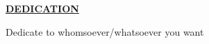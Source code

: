 {\centering \fontsize{18pt}{27pt}\selectfont \textbf{\underline{DEDICATION}} \par} 
\vspace*{\fill}
\begin{center}
	Dedicate to whomsoever/whatsoever you want
\end{center}
\vspace*{\fill}